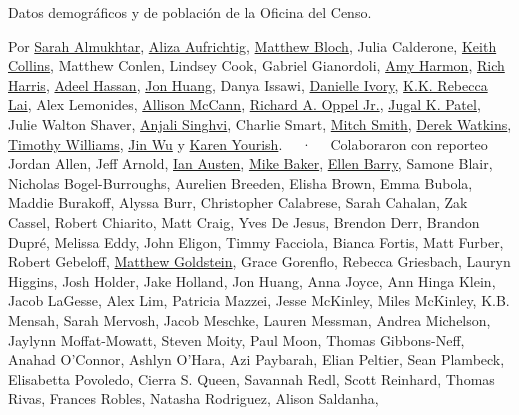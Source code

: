 Datos demográficos y de población de la Oficina del Censo.

Por \href{https://www.nytimes.com/by/sarah-almukhtar}{Sarah Almukhtar},
\href{https://www.nytimes.com/by/aliza-aufrichtig}{Aliza Aufrichtig},
\href{https://www.nytimes.com/by/matthew-bloch}{Matthew Bloch}, Julia
Calderone, \href{https://www.nytimes.com/by/keith-collins}{Keith
Collins}, Matthew Conlen, Lindsey Cook, Gabriel Gianordoli,
\href{https://www.nytimes.com/by/amy-harmon}{Amy Harmon},
\href{https://www.nytimes.com/by/rich-harris}{Rich Harris},
\href{https://www.nytimes.com/by/adeel-hassan}{Adeel Hassan},
\href{https://www.nytimes.com/by/jon-huang}{Jon Huang}, Danya Issawi,
\href{https://www.nytimes.com/by/danielle-ivory}{Danielle Ivory},
\href{https://www.nytimes.com/by/kk-rebecca-lai}{K.K. Rebecca Lai}, Alex
Lemonides, \href{https://www.nytimes.com/by/allison-mccann}{Allison
McCann}, \href{https://www.nytimes.com/by/richard-a-oppel-jr}{Richard A.
Oppel Jr.}, \href{https://www.nytimes.com/by/jugal-k-patel}{Jugal K.
Patel}, Julie Walton Shaver,
\href{https://www.nytimes.com/by/anjali-singhvi}{Anjali Singhvi},
Charlie Smart, \href{https://www.nytimes.com/by/mitch-smith}{Mitch
Smith}, \href{https://www.nytimes.com/by/derek-watkins}{Derek Watkins},
\href{https://www.nytimes.com/by/timothy-williams}{Timothy Williams},
\href{https://www.nytimes.com/by/jin-wu}{Jin Wu} y
\href{https://www.nytimes.com/by/karen-yourish}{Karen Yourish}. ~~·~~
Colaboraron con reporteo Jordan Allen, Jeff Arnold,
\href{https://www.nytimes.com/by/ian-austen}{Ian Austen},
\href{https://www.nytimes.com/by/mike-baker}{Mike Baker},
\href{https://www.nytimes.com/by/ellen-barry}{Ellen Barry}, Samone
Blair, Nicholas Bogel-Burroughs, Aurelien Breeden, Elisha Brown, Emma
Bubola, Maddie Burakoff, Alyssa Burr, Christopher Calabrese, Sarah
Cahalan, Zak Cassel, Robert Chiarito, Matt Craig, Yves De Jesus, Brendon
Derr, Brandon Dupré, Melissa Eddy, John Eligon, Timmy Facciola, Bianca
Fortis, Matt Furber, Robert Gebeloff,
\href{https://www.nytimes.com/by/matthew-goldstein}{Matthew Goldstein},
Grace Gorenflo, Rebecca Griesbach, Lauryn Higgins, Josh Holder, Jake
Holland, Jon Huang, Anna Joyce, Ann Hinga Klein, Jacob LaGesse, Alex
Lim, Patricia Mazzei, Jesse McKinley, Miles McKinley, K.B. Mensah, Sarah
Mervosh, Jacob Meschke, Lauren Messman, Andrea Michelson, Jaylynn
Moffat-Mowatt, Steven Moity, Paul Moon, Thomas Gibbons-Neff, Anahad
O'Connor, Ashlyn O'Hara, Azi Paybarah, Elian Peltier, Sean Plambeck,
Elisabetta Povoledo, Cierra S. Queen, Savannah Redl, Scott Reinhard,
Thomas Rivas, Frances Robles, Natasha Rodriguez, Alison Saldanha,
